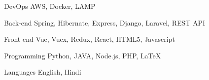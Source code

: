 

\begin{cvskills}

  \cvskill
    {DevOps} %
    {AWS, Docker, LAMP} %

  \cvskill
    {Back-end} %
    {Spring, Hibernate, Express, Django, Laravel, REST API} %

  \cvskill
    {Front-end} %
    {Vue, Vuex, Redux, React, HTML5, Javascript} %

  \cvskill
    {Programming} %
    {Python, JAVA, Node.js, PHP, LaTeX} %

  \cvskill
    {Languages} %
    {English, Hindi} %

\end{cvskills}
